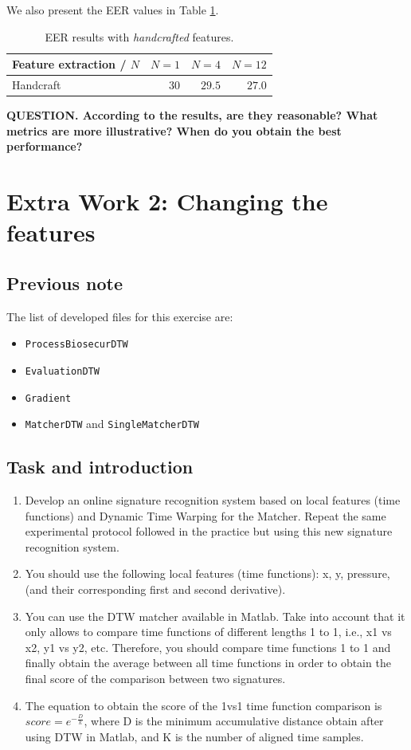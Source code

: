 \documentclass[a4paper]{article}
\def\inline{\lstinline[basicstyle=\ttfamily,keywordstyle={}]}
\begin{document}
{We also present the EER values in Table \ref{table:res:HAND}.

\begin{table}[H]
  \centering
\begin{tabular}{l|rrr}
Feature extraction / $N$ & $N = 1$ & $N=4$  & $N = 12$ \\ \hline
Handcraft                & $30$    & $29.5$ & $27.0$  
\end{tabular}
\caption{EER results with \emph{handcrafted} features.}
\label{table:res:HAND}
\end{table}



\textbf{QUESTION. According to the results, are they reasonable? What metrics are more illustrative? When do you obtain the best performance? }


\section{Extra Work 2: Changing the features}

\subsection*{Previous note}
The list of developed files for this exercise are:

\begin{itemize}
\item \inline{ProcessBiosecurDTW}
\item \inline{EvaluationDTW}
\item \inline{Gradient}
\item \inline{MatcherDTW} and \inline{SingleMatcherDTW}
\end{itemize}

\subsection*{Task and introduction}
\begin{enumerate}
  \item 	Develop an online signature recognition system based on local features (time functions) and Dynamic Time Warping for the Matcher. Repeat the same experimental protocol followed in the practice but using this new signature recognition system.
  \item 	You should use the following local features (time functions): x, y, pressure, (and their corresponding first and second derivative).
  \item 	You can use the DTW matcher available in Matlab. Take into account that it only allows to compare time functions of different lengths 1 to 1, i.e., x1 vs x2, y1 vs y2, etc. Therefore, you should compare time functions 1 to 1 and finally obtain the average between all time functions in order to obtain the final score of the comparison between two signatures.
  \item 	The equation to obtain the score of the 1vs1 time function comparison is \(score=e^{-\frac{D}{k}}\), where D is the minimum accumulative distance obtain after using DTW in Matlab, and K is the number of aligned time samples.
\end{enumerate}

}
\end{document}
